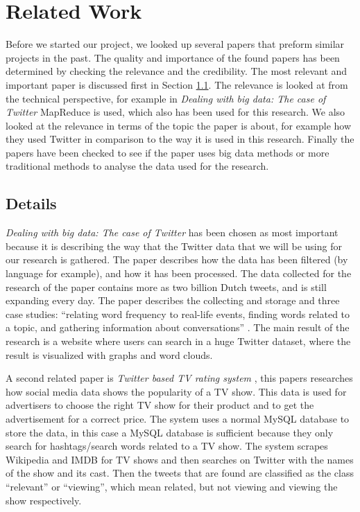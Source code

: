 \section{Related Work}
Before we started our project, we looked up several papers that preform similar projects in the past.
The quality and importance of the found papers has been determined by checking the relevance and the credibility. The most relevant and important paper is discussed first in Section \ref{subsec:relatedWorkDetails}. The relevance is looked at from the technical perspective, for example in \emph{Dealing with big data: The case of Twitter} \cite{sangDealingWithBigData} MapReduce is used, which also has been used for this research. We also looked at the relevance in terms of the topic the paper is about, for example how they used Twitter in comparison to the way it is used in this research. Finally the papers have been checked to see if the paper uses big data methods or more traditional methods to analyse the data used for the research.

\subsection{Details} \label{subsec:relatedWorkDetails}
\emph{Dealing with big data: The case of Twitter} \cite{sangDealingWithBigData} has been chosen as most important because it is describing the way that the Twitter data that we will be using for our research is gathered. The paper describes how the data has been filtered (by language for example), and how it has been processed. The data collected for the research of the paper contains more as two billion Dutch tweets, and is still expanding every day. The paper describes the collecting and storage and three case studies: ``relating word frequency to real-life events, finding words related to a topic, and gathering information about conversations'' \cite{sangDealingWithBigData}. The main result of the research is a website where users can search in a huge Twitter dataset, where the result is visualized with graphs and word clouds.

A second related paper is \emph{Twitter based TV rating system} \cite{souzaTwitterBasedTVRatingSystem}, this papers researches how social media data shows the popularity of a TV show. This data is used for advertisers to choose the right TV show for their product and to get the advertisement for a correct price. The system uses a normal MySQL database to store the data, in this case a MySQL database is sufficient because they only search for hashtags/search words related to a TV show. The system scrapes Wikipedia and IMDB for TV shows and then searches on Twitter with the names of the show and its cast. Then the tweets that are found are classified as the class ``relevant'' or ``viewing'', which mean related, but not viewing and viewing the show respectively.

